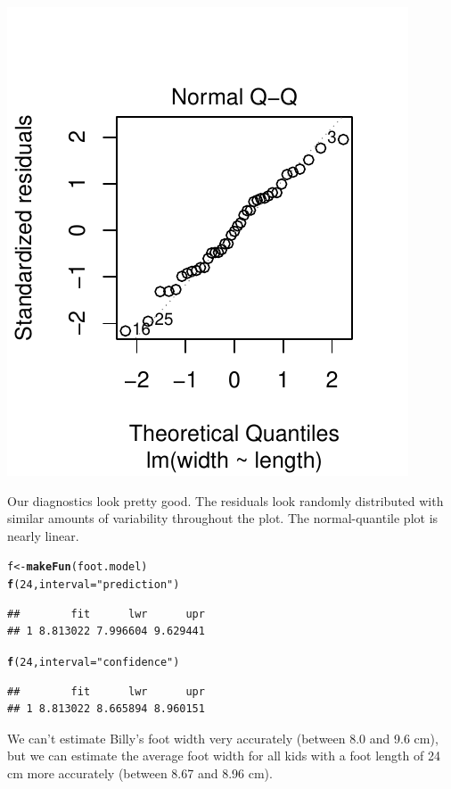 \documentclass[twoside]{book}\usepackage[]{graphicx}\usepackage[]{xcolor}
\makeatletter
\def\maxwidth{ %
  \ifdim\Gin@nat@width>\linewidth
    \linewidth
  \else
    \Gin@nat@width
  \fi
}
\newcommand{\hlnum}[1]{\textcolor[rgb]{0.686,0.059,0.569}{#1}}%
\newcommand{\hlstr}[1]{\textcolor[rgb]{0.192,0.494,0.8}{#1}}%
\newcommand{\hlstd}[1]{\textcolor[rgb]{0.345,0.345,0.345}{#1}}%
\newcommand{\hlkwb}[1]{\textcolor[rgb]{0.69,0.353,0.396}{#1}}%
\newcommand{\hlkwc}[1]{\textcolor[rgb]{0.333,0.667,0.333}{#1}}%
\newcommand{\hlkwd}[1]{\textcolor[rgb]{0.737,0.353,0.396}{\textbf{#1}}}%
\newenvironment{kframe}{%
 \def\at@end@of@kframe{}%
 \ifinner\ifhmode%
  \def\at@end@of@kframe{\end{minipage}}%
  \begin{minipage}{\columnwidth}%
 \fi\fi%
 \def\FrameCommand##1{\hskip\@totalleftmargin \hskip-\fboxsep
 \colorbox{shadecolor}{##1}\hskip-\fboxsep
     \hskip-\linewidth \hskip-\@totalleftmargin \hskip\columnwidth}%
 \MakeFramed {\advance\hsize-\width
   \@totalleftmargin\z@ \linewidth\hsize
   \@setminipage}}%
 {\par\unskip\endMakeFramed%
 \at@end@of@kframe}
\newenvironment{knitrout}{}{} %
\makeatother
\begin{document}
\begin{solution}
\begin{knitrout}
{\includegraphics[width=\maxwidth]{figures/fig-unnamed-chunk-184-2} 

}



\end{knitrout}
Our diagnostics look pretty good.  The residuals look randomly distributed with
similar amounts of variability throughout the plot.  The normal-quantile plot
is nearly linear.

\begin{knitrout}
\color{fgcolor}\begin{kframe}
\begin{alltt}
\hlstd{f} \hlkwb{<-} \hlkwd{makeFun}\hlstd{(foot.model)}
\hlkwd{f}\hlstd{(}\hlnum{24}\hlstd{,} \hlkwc{interval}\hlstd{=}\hlstr{"prediction"}\hlstd{)}
\end{alltt}
\begin{verbatim}
##        fit      lwr      upr
## 1 8.813022 7.996604 9.629441
\end{verbatim}
\begin{alltt}
\hlkwd{f}\hlstd{(}\hlnum{24}\hlstd{,} \hlkwc{interval}\hlstd{=}\hlstr{"confidence"}\hlstd{)}
\end{alltt}
\begin{verbatim}
##        fit      lwr      upr
## 1 8.813022 8.665894 8.960151
\end{verbatim}
\end{kframe}
\end{knitrout}
We can't estimate Billy's foot width very accurately (between 8.0 and 9.6 cm),
but we can estimate the average foot width for all kids with a foot length of
24 cm more accurately (between 8.67 and 8.96 cm).
\end{solution}
\end{document}
